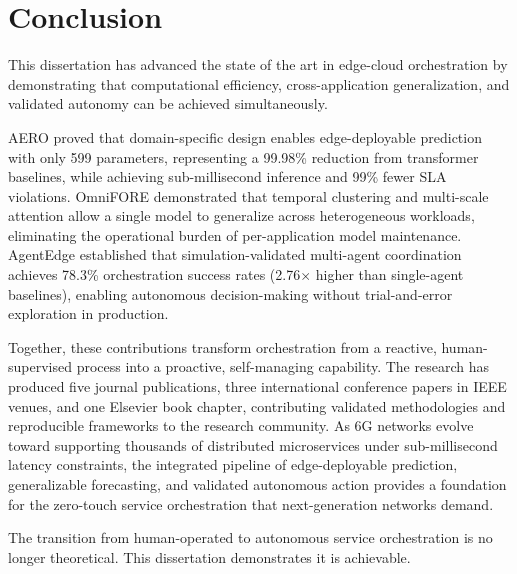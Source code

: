 \section{Conclusion}
\label{sec:ch6_conclusion}

This dissertation has advanced the state of the art in edge-cloud orchestration by demonstrating that computational efficiency, cross-application generalization, and validated autonomy can be achieved simultaneously.

\ac{AERO} proved that domain-specific design enables edge-deployable prediction with only 599 parameters, representing a 99.98\% reduction from transformer baselines, while achieving sub-millisecond inference and 99\% fewer \ac{SLA} violations. \ac{OmniFORE} demonstrated that temporal clustering and multi-scale attention allow a single model to generalize across heterogeneous workloads, eliminating the operational burden of per-application model maintenance. \ac{AgentEdge} established that simulation-validated multi-agent coordination achieves 78.3\% orchestration success rates (2.76$\times$ higher than single-agent baselines), enabling autonomous decision-making without trial-and-error exploration in production.

Together, these contributions transform orchestration from a reactive, human-supervised process into a proactive, self-managing capability. The research has produced five journal publications, three international conference papers in \ac{IEEE} venues, and one Elsevier book chapter, contributing validated methodologies and reproducible frameworks to the research community. As \ac{6G} networks evolve toward supporting thousands of distributed microservices under sub-millisecond latency constraints, the integrated pipeline of edge-deployable prediction, generalizable forecasting, and validated autonomous action provides a foundation for the zero-touch service orchestration that next-generation networks demand.

The transition from human-operated to autonomous service orchestration is no longer theoretical. This dissertation demonstrates it is achievable.
